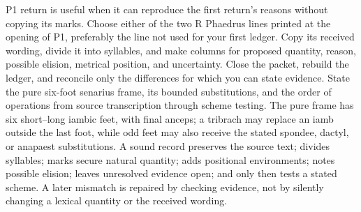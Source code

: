 \begin{courseunit}{P1}
{  return is useful when it can reproduce the first return's reasons without
  copying its marks.}
  {Choose either of the two R Phaedrus lines printed at the opening of P1,
  preferably the line not used for your first ledger. Copy its received
  wording, divide it into syllables, and make columns for proposed quantity,
  reason, possible elision, metrical position, and uncertainty. Close the
  packet, rebuild the ledger, and reconcile only the differences for which
  you can state evidence.}
  {State the pure six-foot senarius frame, its bounded substitutions, and the
  order of operations from source transcription through scheme testing.}
  {The pure frame has six short--long iambic feet, with final anceps; a
  tribrach may replace an iamb outside the last foot, while odd feet may also
  receive the stated spondee, dactyl, or anapaest substitutions. A sound
  record preserves the source text; divides syllables; marks secure
  natural quantity; adds positional environments; notes possible elision;
  leaves unresolved evidence open; and only then tests a stated scheme. A
  later mismatch is repaired by checking evidence, not by silently changing a
  lexical quantity or the received wording.}
\end{courseunit}

